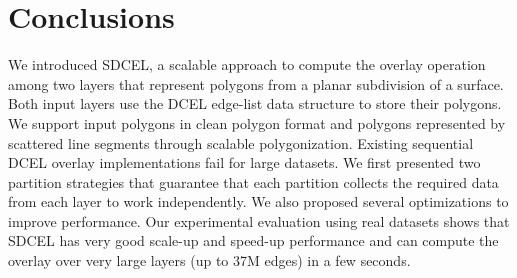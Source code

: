 \section{Conclusions} \label{sec:conclusions}
We introduced SDCEL, a scalable approach to compute the overlay operation among two layers that represent polygons from a planar subdivision of a surface. Both input layers use the DCEL edge-list data structure to store their polygons. We support input polygons in clean polygon format and polygons represented by scattered line segments through scalable polygonization. Existing sequential DCEL overlay implementations fail for large datasets. We first presented two partition strategies that guarantee that each partition collects the required data from each layer to work independently. We also proposed several optimizations to improve performance. Our experimental evaluation using real datasets shows that SDCEL has very good scale-up and speed-up performance and can compute the overlay over very large layers (up to 37M edges) in a few seconds.